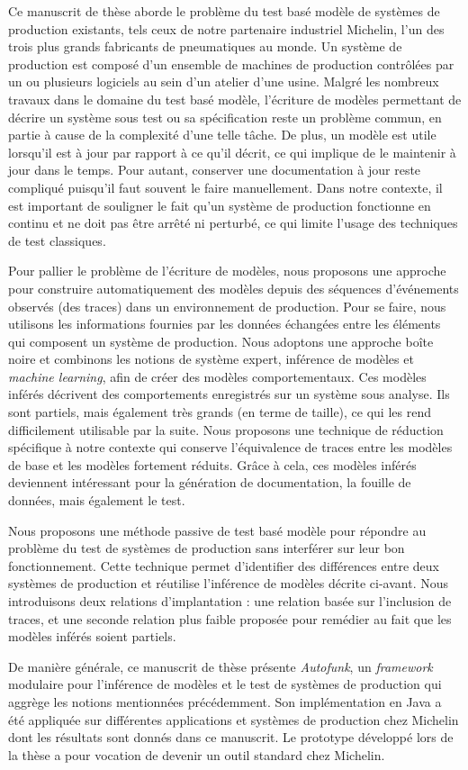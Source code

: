 Ce manuscrit de thèse aborde le problème du test basé modèle de
systèmes de production existants, tels ceux de notre partenaire
industriel Michelin, l'un des trois plus grands fabricants de
pneumatiques au monde. Un système de production est composé d'un
ensemble de machines de production contrôlées par un ou plusieurs
logiciels au sein d'un atelier d'une usine. Malgré les nombreux
travaux dans le domaine du test basé modèle, l'écriture de
modèles permettant de décrire un système sous test ou sa
spécification reste un problème commun, en partie à cause de la
complexité d'une telle tâche. De plus, un modèle est utile
lorsqu'il est à jour par rapport à ce qu'il décrit, ce qui
implique de le maintenir à jour dans le temps. Pour autant,
conserver une documentation à jour reste compliqué puisqu'il faut
souvent le faire manuellement. Dans notre contexte, il est
important de souligner le fait qu'un système de production
fonctionne en continu et ne doit pas être arrêté ni perturbé, ce
qui limite l'usage des techniques de test classiques.

Pour pallier le problème de l'écriture de modèles, nous proposons
une approche pour construire automatiquement des modèles depuis
des séquences d'événements observés (des traces) dans un
environnement de production. Pour se faire, nous utilisons les
informations fournies par les données échangées entre les
éléments qui composent un système de production. Nous adoptons
une approche boîte noire et combinons les notions de système
expert, inférence de modèles et \emph{machine learning}, afin de
créer des modèles comportementaux. Ces modèles inférés décrivent
des comportements enregistrés sur un système sous analyse. Ils
sont partiels, mais également très grands (en terme de taille),
ce qui les rend difficilement utilisable par la suite. Nous
proposons une technique de réduction spécifique à notre contexte
qui conserve l'équivalence de traces entre les modèles de base et
les modèles fortement réduits. Grâce à cela, ces modèles inférés
deviennent intéressant pour la génération de documentation, la
fouille de données, mais également le test.

Nous proposons une méthode passive de test basé modèle pour
répondre au problème du test de systèmes de production sans
interférer sur leur bon fonctionnement. Cette technique permet
d'identifier des différences entre deux systèmes de production et
réutilise l'inférence de modèles décrite ci-avant. Nous
introduisons deux relations d'implantation : une relation basée
sur l'inclusion de traces, et une seconde relation plus faible
proposée pour remédier au fait que les modèles inférés soient
partiels.

De manière générale, ce manuscrit de thèse présente
\emph{Autofunk}, un \emph{framework} modulaire pour l'inférence
de modèles et le test de systèmes de production qui aggrège les
notions mentionnées précédemment. Son implémentation en Java a
été appliquée sur différentes applications et systèmes de
production chez Michelin dont les résultats sont donnés dans ce
manuscrit. Le prototype développé lors de la thèse a pour
vocation de devenir un outil standard chez Michelin.

